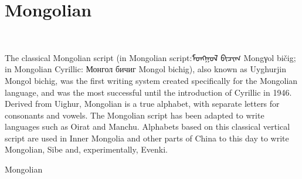 \section{Mongolian}
^^A\newfontfamily{}

The classical Mongolian script (in Mongolian script:{\mongolian ᠮᠣᠩᠭᠣᠯ ᠪᠢᠴᠢᠭ᠌} {\pan Mongγol bičig}; in Mongolian Cyrillic: {\pan Монгол бичиг} Mongol bichig), also known as Uyghurjin Mongol bichig, was the first writing system created specifically for the Mongolian language, and was the most successful until the introduction of Cyrillic in 1946. Derived from Uighur, Mongolian is a true alphabet, with separate letters for consonants and vowels. The Mongolian script has been adapted to write languages such as Oirat and Manchu. Alphabets based on this classical vertical script are used in Inner Mongolia and other parts of China to this day to write Mongolian, Sibe and, experimentally, Evenki.

\begin{scriptexample}[]{Mongolian}
\end{scriptexample}

